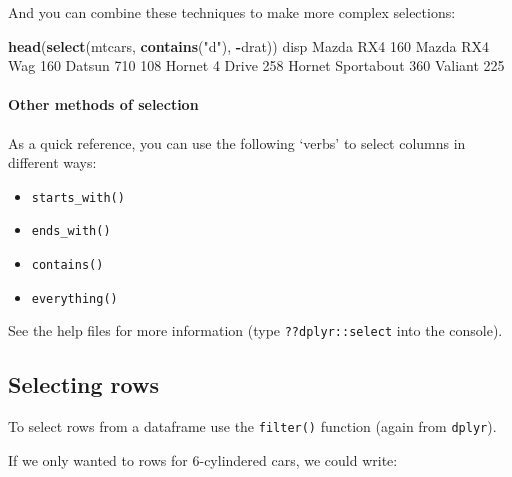 \documentclass[]{article}
\newenvironment{Shaded}{\begin{snugshade}}{\end{snugshade}}
\newcommand{\DecValTok}[1]{\textcolor[rgb]{0.00,0.00,0.81}{#1}}
\newcommand{\KeywordTok}[1]{\textcolor[rgb]{0.13,0.29,0.53}{\textbf{#1}}}
\newcommand{\NormalTok}[1]{#1}
\newcommand{\OperatorTok}[1]{\textcolor[rgb]{0.81,0.36,0.00}{\textbf{#1}}}
\newcommand{\StringTok}[1]{\textcolor[rgb]{0.31,0.60,0.02}{#1}}
\providecommand{\tightlist}{%
  \setlength{\itemsep}{0pt}\setlength{\parskip}{0pt}}
\let\oldparagraph\paragraph
\renewcommand{\paragraph}[1]{\oldparagraph{#1}\mbox{}}
\begin{document}
And you can combine these techniques to make more complex selections:

\begin{Shaded}
\begin{Highlighting}[]
\KeywordTok{head}\NormalTok{(}\KeywordTok{select}\NormalTok{(mtcars, }\KeywordTok{contains}\NormalTok{(}\StringTok{"d"}\NormalTok{), }\OperatorTok{-}\NormalTok{drat))}
\NormalTok{                  disp}
\NormalTok{Mazda RX4          }\DecValTok{160}
\NormalTok{Mazda RX4 Wag      }\DecValTok{160}
\NormalTok{Datsun }\DecValTok{710}         \DecValTok{108}
\NormalTok{Hornet }\DecValTok{4}\NormalTok{ Drive     }\DecValTok{258}
\NormalTok{Hornet Sportabout  }\DecValTok{360}
\NormalTok{Valiant            }\DecValTok{225}
\end{Highlighting}
\end{Shaded}

\hypertarget{other-methods-of-selection}{%
\paragraph{Other methods of selection}\label{other-methods-of-selection}}

As a quick reference, you can use the following `verbs' to select columns in
different ways:

\begin{itemize}
\tightlist
\item
  \texttt{starts\_with()}
\item
  \texttt{ends\_with()}
\item
  \texttt{contains()}
\item
  \texttt{everything()}
\end{itemize}

See the help files for more information (type \texttt{??dplyr::select} into the
console).

\hypertarget{selecting-rows}{%
\subsection*{Selecting rows}\label{selecting-rows}}

To select rows from a dataframe use the \texttt{filter()} function (again from
\texttt{dplyr}).

If we only wanted to rows for 6-cylindered cars, we could write:
\end{document}
